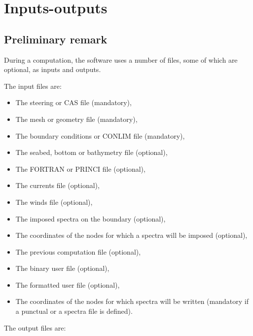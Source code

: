\chapter{ Inputs-outputs}

\section{ Preliminary remark}

During a computation, the \tomawac software uses a number of files, some of which are
optional, as inputs and outputs.

 The input files are:

\begin{itemize}
\item  The steering or CAS file (mandatory),

\item  The mesh or geometry file (mandatory),

\item  The boundary conditions or CONLIM file (mandatory),

\item  The seabed, bottom or bathymetry file (optional),

\item  The FORTRAN or PRINCI file (optional),

\item  The currents file (optional),

\item  The winds file (optional),

\item The imposed spectra on the boundary (optional),

\item The coordinates of the nodes for which a spectra will be imposed (optional),

\item  The previous computation file (optional),

\item  The binary user file (optional),

\item  The formatted user file (optional),

\item The coordinates of the nodes for which spectra will be written (mandatory if a
  punctual or a spectra file is defined).
\end{itemize}

The output files are:


